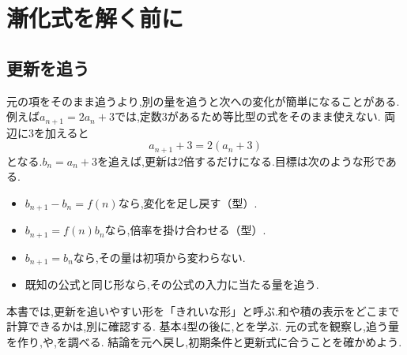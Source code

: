 
\section{漸化式を解く前に}\label{節：漸化式を解く前に}



\subsection{更新を追う}

  元の項をそのまま追うより,別の量を追うと次への変化が簡単になることがある.
  例えば$a_{n+1}=2a_n+3$では,定数$3$があるため等比型の式をそのまま使えない.
  両辺に$3$を加えると
  \[
    a_{n+1}+3=2(a_n+3)
  \]
  となる.$b_n=a_n+3$を追えば,更新は2倍するだけになる.目標は次のような形である.
  \begin{itemize}
    \item $b_{n+1}-b_n=f(n)$なら,変化を足し戻す（型）.
    \item $b_{n+1}=f(n)b_n$なら,倍率を掛け合わせる（型）.
    \item $b_{n+1}=b_n$なら,その量は初項から変わらない.
    \item 既知の公式と同じ形なら,その公式の入力に当たる量を追う.
  \end{itemize}
  本書では,更新を追いやすい形を「きれいな形」と呼ぶ.和や積の表示をどこまで計算できるかは,別に確認する.
  基本4型の後に,とを学ぶ.
  元の式を観察し,追う量を作り,や,を調べる.
  結論を元へ戻し,初期条件と更新式に合うことを確かめよう.
  \BookFigApproach
